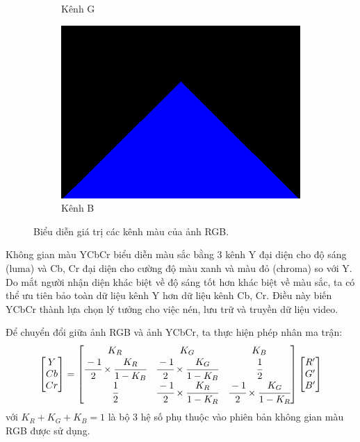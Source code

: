 \documentclass[12pt]{extreport}
\begin{document}
\begin{figure}[H]
\begin{subfigure}[H]{0.3\textwidth}
        \caption{Kênh G}
    \end{subfigure}
    \begin{subfigure}[H]{0.3\textwidth}
        \centering
        \includegraphics[width=\linewidth]{figure27.png}
        \caption{Kênh B}
    \end{subfigure}
    \caption{Biểu diễn giá trị các kênh màu của ảnh RGB.}
\end{figure}

Không gian màu YCbCr biểu diễn màu sắc bằng 3 kênh Y đại diện cho độ sáng (luma) và Cb, Cr đại diện cho cường độ màu xanh và màu đỏ (chroma) so với Y. Do mắt người nhận diện khác biệt về độ sáng tốt hơn khác biệt về màu sắc, ta có thể ưu tiên bảo toàn dữ liệu kênh Y hơn dữ liệu kênh Cb, Cr. Điều này biến YCbCr thành lựa chọn lý tưởng cho việc nén, lưu trữ và truyền dữ liệu video.

Để chuyển đổi giữa ảnh RGB và ảnh YCbCr, ta thực hiện phép nhân ma trận:
$$ \begin{bmatrix}
        Y  \\
        Cb \\
        Cr
    \end{bmatrix} = \begin{bmatrix}
        K_R                                       & K_G                                       & K_B                                       \\
        \cfrac{-1}{2} \times \cfrac{K_R}{1 - K_B} & \cfrac{-1}{2} \times \cfrac{K_G}{1 - K_B} & \cfrac{1}{2}                              \\
        \cfrac{1}{2}                              & \cfrac{-1}{2} \times \cfrac{K_R}{1 - K_R} & \cfrac{-1}{2} \times \cfrac{K_G}{1 - K_R} \\
    \end{bmatrix} \begin{bmatrix}
        R' \\
        G' \\
        B'
    \end{bmatrix} $$
với $ K_R + K_G + K_B = 1 $ là bộ 3 hệ số phụ thuộc vào phiên bản không gian màu RGB được sử dụng.
\end{document}
